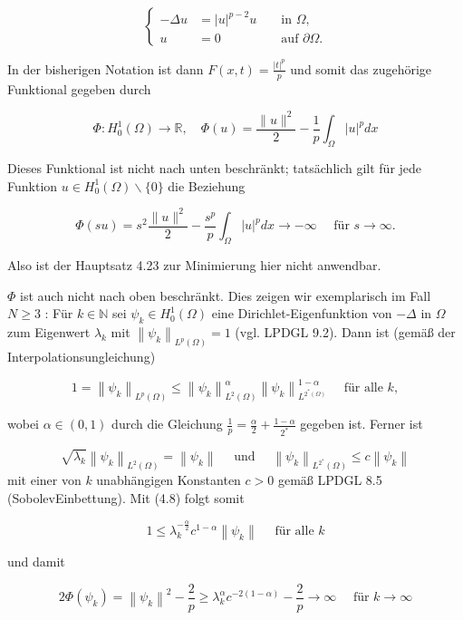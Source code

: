 \documentclass[10pt, letterpaper]{article}
\begin{document}
$$
\left\{\begin{aligned}
-\Delta u & =|u|^{p-2} u & & \text { in } \Omega, \\
u & =0 & & \text { auf } \partial \Omega .
\end{aligned}\right.
$$

In der bisherigen Notation ist dann $F(x, t)=\frac{|t|^{p}}{p}$ und somit das zugehörige Funktional gegeben durch

$$
\Phi: H_{0}^{1}(\Omega) \rightarrow \mathbb{R}, \quad \Phi(u)=\frac{\|u\|^{2}}{2}-\frac{1}{p} \int_{\Omega}|u|^{p} d x
$$

Dieses Funktional ist nicht nach unten beschränkt; tatsächlich gilt für jede Funktion $u \in H_{0}^{1}(\Omega) \backslash\{0\}$ die Beziehung

$$
\Phi(s u)=s^{2} \frac{\|u\|^{2}}{2}-\frac{s^{p}}{p} \int_{\Omega}|u|^{p} d x \rightarrow-\infty \quad \text { für } s \rightarrow \infty .
$$

Also ist der Hauptsatz 4.23 zur Minimierung hier nicht anwendbar.

$\Phi$ ist auch nicht nach oben beschränkt. Dies zeigen wir exemplarisch im Fall $N \geq 3$ : Für $k \in \mathbb{N}$ sei $\psi_{k} \in H_{0}^{1}(\Omega)$ eine Dirichlet-Eigenfunktion von $-\Delta$ in $\Omega$ zum Eigenwert $\lambda_{k}$ mit $\left\|\psi_{k}\right\|_{L^{p}(\Omega)}=1$ (vgl. LPDGL 9.2). Dann ist (gemäß der Interpolationsungleichung)

$$
1=\left\|\psi_{k}\right\|_{L^{p}(\Omega)} \leq\left\|\psi_{k}\right\|_{L^{2}(\Omega)}^{\alpha}\left\|\psi_{k}\right\|_{L^{2^{*}(\Omega)}}^{1-\alpha} \quad \text { für alle } k,
$$

wobei $\alpha \in(0,1)$ durch die Gleichung $\frac{1}{p}=\frac{\alpha}{2}+\frac{1-\alpha}{2^{*}}$ gegeben ist. Ferner ist

$$
\sqrt{\lambda_{k}}\left\|\psi_{k}\right\|_{L^{2}(\Omega)}=\left\|\psi_{k}\right\| \quad \text { und } \quad\left\|\psi_{k}\right\|_{L^{2^{*}}(\Omega)} \leq c\left\|\psi_{k}\right\|
$$
mit einer von $k$ unabhängigen Konstanten $c>0$ gemäß LPDGL 8.5 (SobolevEinbettung). Mit (4.8) folgt somit

$$
1 \leq \lambda_{k}^{-\frac{\alpha}{2}} c^{1-\alpha}\left\|\psi_{k}\right\| \quad \text { für alle } k
$$

und damit

$$
2 \Phi\left(\psi_{k}\right)=\left\|\psi_{k}\right\|^{2}-\frac{2}{p} \geq \lambda_{k}^{\alpha} c^{-2(1-\alpha)}-\frac{2}{p} \rightarrow \infty \quad \text { für } k \rightarrow \infty
$$
\end{document}
